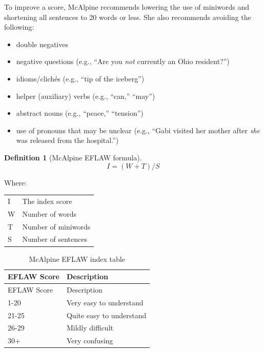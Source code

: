 \documentclass[
]{book}
\providecommand{\tightlist}{%
  \setlength{\itemsep}{0pt}\setlength{\parskip}{0pt}}
\theoremstyle{definition}
\newtheorem{definition}{Definition}[chapter]
\theoremstyle{definition}
\theoremstyle{definition}
\theoremstyle{definition}
\theoremstyle{remark}
\begin{document}
To improve a score, McAlpine recommends lowering the use of miniwords and shortening all sentences to 20 words or less. She also recommends avoiding the following:

\begin{itemize}
\tightlist
\item
  double negatives
\item
  negative questions (e.g., ``Are you \emph{not} currently an Ohio resident?'')
\item
  idioms/clichés (e.g., ``tip of the iceberg'')
\item
  helper (auxiliary) verbs (e.g., ``can,'' ``may'')
\item
  abstract nouns (e.g., ``peace,'' ``tension'')
\item
  use of pronouns that may be unclear (e.g., ``Gabi visited her mother after \emph{she} was released from the hospital.'')
\end{itemize}

\begin{definition}[McAlpine EFLAW formula]
\protect\hypertarget{def:eflaw}{}{\label{def:eflaw} {} }\[
I = (W + T) / S
\]
\end{definition}

Where:

\begin{longtable}[]{@{}
  >{\raggedright\arraybackslash}p{}
  >{\raggedright\arraybackslash}p{}@{}}
\toprule
\endhead
I & The index score \\
W & Number of words \\
T & Number of miniwords \\
S & Number of sentences \\
\bottomrule
\end{longtable}

\begin{longtable}[]{@{}ll@{}}
\caption{McAlpine EFLAW index table}\tabularnewline
\toprule
EFLAW Score & Description \\
\midrule
\endfirsthead
\toprule
EFLAW Score & Description \\
\midrule
\endhead
1-20 & Very easy to understand \\
21-25 & Quite easy to understand \\
26-29 & Mildly difficult \\
30+ & Very confusing \\
\bottomrule
\end{longtable}
\end{document}
